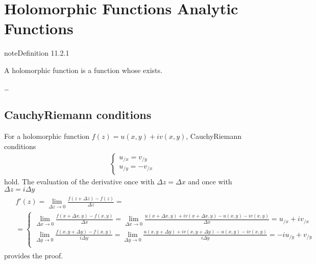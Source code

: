 \documentclass[letterpaper,10pt,english]{jupyterBook}
\begin{document}
\section{Holomorphic Functions \sphinxhyphen{} Analytic Functions}
\label{\detokenize{ch/complex/analysis:holomorphic-functions-analytic-functions}}\label{\detokenize{ch/complex/analysis:complex-analysis-holo-fun}}\label{ch/complex/analysis:definition-0}
\begin{sphinxadmonition}{note}{Definition 11.2.1}



\sphinxAtStartPar
A holomorphic function is a function whose {\hyperref[\detokenize{ch/complex/analysis:complex-analysis-fun-derivative}]{}} exists.
\end{sphinxadmonition}

\sphinxAtStartPar
{} …


\subsection{Cauchy\sphinxhyphen{}Riemann conditions}
\label{\detokenize{ch/complex/analysis:cauchy-riemann-conditions}}\label{\detokenize{ch/complex/analysis:complex-analysis-holo-fun-cauchy-riemann}}
\sphinxAtStartPar
For a holomorphic function \(f(z) = u(x,y) + i v(x,y)\), Cauchy\sphinxhyphen{}Riemann conditions
\begin{equation*}
\begin{split}\begin{cases}
u_{/x} = v_{/y} \\
u_{/y} = - v_{/x}
\end{cases}\end{split}
\end{equation*}
\sphinxAtStartPar
hold. The evaluation of the derivative once with \(\Delta z = \Delta x\) and once with \(\Delta z = i \Delta y\)
\begin{equation*}
\begin{split}\begin{aligned}
& f'(z) = \lim_{\Delta z \rightarrow 0} \frac{f(z+\Delta z) - f(z)}{\Delta z} = \\ 
& = \left\{
\begin{aligned}
  \lim_{\Delta x \rightarrow 0} \frac{f(x+\Delta x,y) - f(x,y)}{\Delta x} = \lim_{\Delta x \rightarrow 0} \frac{u(x+\Delta x,y) + i v(x+\Delta x,y) - u(x,y) - i v(x,y)}{\Delta x} = u_{/x} + i v_{/x} \\ 
  \lim_{\Delta y \rightarrow 0} \frac{f(x,y+\Delta y) - f(x,y)}{i \Delta y} = \lim_{\Delta y \rightarrow 0}  \frac{u(x,y+\Delta y) + i v(x,y+\Delta y) - u(x,y) - i v(x,y)}{i \Delta y} = -i u_{/y} + v_{/y} \\ 
\end{aligned}
\right.
\end{aligned}\end{split}
\end{equation*}
\sphinxAtStartPar
provides the proof.
\end{document}
